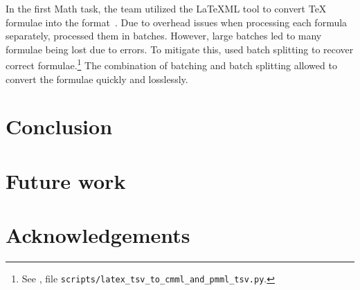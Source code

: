 \documentclass[final]{ltugboat}
\begin{document}
In the first Math task, the  team utilized the \LaTeX ML tool to convert \TeX{} formulae into the  format~\cite[Section~2.2]{novotny2020three}. Due to overhead issues when processing each formula separately,  processed them in batches. However, large batches led to many formulae being lost due to errors. To mitigate this,  used batch splitting to recover correct formulae.\footnote{See , file \texttt{scripts/latex\_tsv\_to\_cmml\_and\_pmml\_tsv.py}.} The combination of batching and batch splitting allowed  to convert the formulae quickly and losslessly.

\section{Conclusion}
\label{sec:conclusion}

\section{Future work}
\label{sec:future-work}

\section*{Acknowledgements}



\vfill

\makesignature
\end{document}
